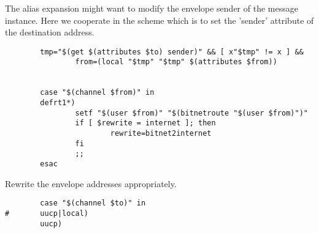 The alias expansion might want to modify the envelope sender
of the message instance.  Here we cooperate in the scheme which
is to set the 'sender' attribute of the destination address.
\begin{tscreen}
\begin{verbatim}
        tmp="$(get $(attributes $to) sender)" && [ x"$tmp" != x ] &&
                from=(local "$tmp" "$tmp" $(attributes $from))


        case "$(channel $from)" in
        defrt1*)
                setf "$(user $from)" "$(bitnetroute "$(user $from)")"
                if [ $rewrite = internet ]; then
                        rewrite=bitnet2internet
                fi
                ;;
        esac
\end{verbatim}
\end{tscreen}

Rewrite the envelope addresses appropriately.
\begin{tscreen}
\begin{verbatim}
        case "$(channel $to)" in
#       uucp|local)
        uucp)
\end{verbatim}
\end{tscreen}


